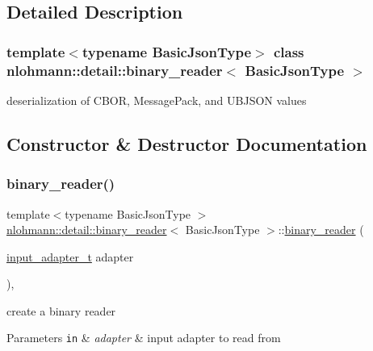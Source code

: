 \subsection{Detailed Description}
\subsubsection*{template$<$typename Basic\+Json\+Type$>$\newline
class nlohmann\+::detail\+::binary\+\_\+reader$<$ Basic\+Json\+Type $>$}

deserialization of C\+B\+OR, Message\+Pack, and U\+B\+J\+S\+ON values 

\subsection{Constructor \& Destructor Documentation}
\mbox{\label{classnlohmann_1_1detail_1_1binary__reader_a7e643baadaf4c31718cd74833bdd542f}} 
\subsubsection{\texorpdfstring{binary\+\_\+reader()}{binary\_reader()}}
{\footnotesize\ttfamily template$<$typename Basic\+Json\+Type $>$ \\
\mbox{\hyperlink{classnlohmann_1_1detail_1_1binary__reader}{nlohmann\+::detail\+::binary\+\_\+reader}}$<$ Basic\+Json\+Type $>$\+::\mbox{\hyperlink{classnlohmann_1_1detail_1_1binary__reader}{binary\+\_\+reader}} (\begin{DoxyParamCaption}\item[{\mbox{\hyperlink{namespacenlohmann_1_1detail_ae132f8cd5bb24c5e9b40ad0eafedf1c2}{input\+\_\+adapter\+\_\+t}}}]{adapter }\end{DoxyParamCaption})\hspace{0.3cm}{\ttfamily [inline]}, {\ttfamily [explicit]}}



create a binary reader 


\begin{DoxyParams}[1]{Parameters}
\mbox{\tt in}  & {\em adapter} & input adapter to read from \\
\hline
\end{DoxyParams}


